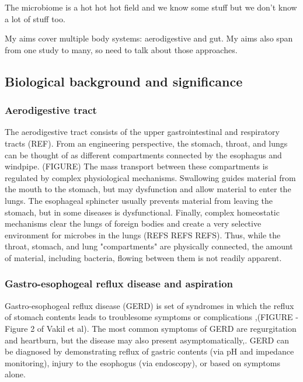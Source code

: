 \documentclass[12pt]{article}
\begin{document}
The microbiome is a hot hot hot field and we know some stuff but we don't know a lot of stuff too.

My aims cover multiple body systems: aerodigestive and gut. My aims also span from one study to many, so need to talk about those approaches.

\subsection{Biological background and significance}

\subsubsection{Aerodigestive tract}
The aerodigestive tract consists of the upper gastrointestinal and respiratory tracts (REF). From an engineering perspective, the stomach, throat, and lungs can be thought of as different compartments connected by the esophagus and windpipe. (FIGURE) The mass transport between these compartments is regulated by complex physiological mechanisms. Swallowing guides material from the mouth to the stomach, but may dysfunction and allow material to enter the lungs. The esophageal sphincter usually prevents material from leaving the stomach, but in some diseases is dysfunctional. Finally, complex homeostatic mechanisms clear the lungs of foreign bodies and create a very selective environment for microbes in the lungs (REFS REFS REFS). Thus, while the throat, stomach, and lung "compartments" are physically connected, the amount of material, including bacteria, flowing between them is not readily apparent. 

\subsubsection{Gastro-esophogeal reflux disease and aspiration}

Gastro-esophogeal reflux disease (GERD) is set of syndromes in which the reflux of stomach contents leads to troublesome symptoms or complications \cite{vakil-gerd_defn-2006},\cite{dent-gerd_epi-2005}(FIGURE - Figure 2 of Vakil et al). The most common symptoms of GERD are regurgitation and heartburn, but the disease may also present asymptomatically\cite{vakil-gerd_defn-2006},\cite{dent-gerd_epi-2005}. GERD can be diagnosed by demonstrating reflux of gastric contents (via pH and impedance monitoring), injury to the esophogus (via endoscopy), or based on symptoms alone\cite{vakil-gerd_defn-2006}. 
\end{document}
